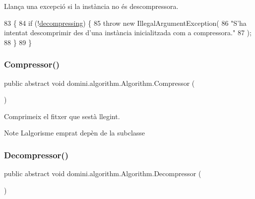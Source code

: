 Llança una excepció si la instància no és descompressora. 


\begin{DoxyCode}
83                                        \{
84         \textcolor{keywordflow}{if} (!\hyperlink{classdomini_1_1algorithm_1_1Algorithm_a0ec73147fb68a16e53801ea5da35b089}{decompressing}) \{
85             \textcolor{keywordflow}{throw} \textcolor{keyword}{new} IllegalArgumentException(
86                 \textcolor{stringliteral}{"S'ha intentat descomprimir des d'una instància inicialitzada com a compressora."}
87             );
88         \}
89     \}
\end{DoxyCode}
\mbox{\label{classdomini_1_1algorithm_1_1Algorithm_afed9609e38c82431e0631fd84dbc89e4}} 
\subsubsection{\texorpdfstring{Compressor()}{Compressor()}}
{\footnotesize\ttfamily public abstract void domini.\+algorithm.\+Algorithm.\+Compressor (\begin{DoxyParamCaption}{ }\end{DoxyParamCaption})\hspace{0.3cm}{\ttfamily [abstract]}}



Comprimeix el fitxer que s\textquotesingle{}està llegint. 

\begin{DoxyNote}{Note}
L\textquotesingle{}algorisme emprat depèn de la subclasse 
\end{DoxyNote}
\mbox{\label{classdomini_1_1algorithm_1_1Algorithm_ae712f08ef4b86cb625a9e00057ad8836}} 
\subsubsection{\texorpdfstring{Decompressor()}{Decompressor()}}
{\footnotesize\ttfamily public abstract void domini.\+algorithm.\+Algorithm.\+Decompressor (\begin{DoxyParamCaption}{ }\end{DoxyParamCaption})\hspace{0.3cm}{\ttfamily [abstract]}}



